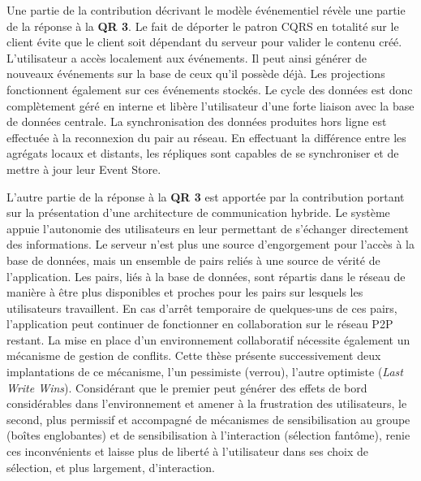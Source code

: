 Une partie de la contribution décrivant le modèle événementiel révèle une partie de 
la réponse à la \textbf{QR 3}.
Le fait de déporter le patron \gls{CQRS} en totalité sur le client évite que le client 
soit dépendant du serveur pour valider le contenu créé. L'utilisateur a accès 
localement aux événements. Il peut ainsi générer de nouveaux événements sur la 
base de ceux qu'il possède déjà. Les projections fonctionnent également sur ces 
événements stockés. Le cycle des données est donc complètement géré en 
interne et libère l'utilisateur d'une forte liaison avec la base de données centrale. 
La synchronisation des données produites hors ligne est effectuée à la 
reconnexion du pair au réseau. En effectuant la différence entre les agrégats 
locaux et distants, les répliques sont capables de se synchroniser et de mettre à 
jour leur Event Store. 

L'autre partie de la réponse à la \textbf{QR 3} est apportée par la contribution 
portant sur la présentation d'une architecture de communication hybride. Le 
système appuie l'autonomie des utilisateurs en leur permettant de s'échanger 
directement des 
informations. Le serveur n'est plus une source d'engorgement pour l'accès à la 
base de données, mais un ensemble de pairs reliés à une source de vérité de 
l'application. Les pairs, liés à la base de données, sont répartis dans le réseau de 
manière à être plus disponibles et proches pour les pairs sur lesquels les 
utilisateurs travaillent. 
En cas d'arrêt temporaire de quelques-uns de ces pairs, l'application 
peut continuer de fonctionner en collaboration sur le réseau \gls{P2P} restant. 
La mise en place d'un environnement collaboratif nécessite également un 
mécanisme de gestion de conflits. Cette thèse présente successivement deux 
implantations de ce mécanisme, l'un pessimiste (verrou), l'autre optimiste 
(\textit{Last Write Wins}). 
Considérant que le premier peut générer des effets de bord considérables dans 
l'environnement et amener à la frustration des utilisateurs, le second, plus 
permissif et accompagné de mécanismes de sensibilisation au groupe (boîtes 
englobantes) et de sensibilisation à l'interaction (sélection fantôme), 
renie ces inconvénients et laisse plus de liberté à l'utilisateur dans ses choix de 
sélection, et plus largement, d'interaction.
%


